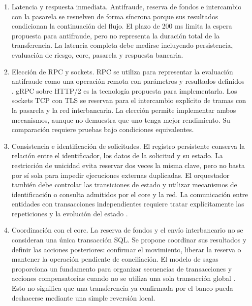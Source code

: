 \documentclass[12pt,a4paper]{article}
\begin{document}
\begin{enumerate}

    \item Latencia y respuesta inmediata.
    Antifraude, reserva de fondos e intercambio con la
    pasarela se resuelven de forma síncrona porque sus
    resultados condicionan la continuación del flujo.
    El plazo de 200 ms limita la espera propuesta para
    antifraude, pero no representa la duración total de
    la transferencia. La latencia completa debe medirse
    incluyendo persistencia, evaluación de riesgo, core,
    pasarela y respuesta bancaria.

    \item Elección de RPC y sockets.
    RPC se utiliza para representar la evaluación antifraude
    como una operación remota con parámetros y resultados
    definidos \cite{birrell1984}. gRPC sobre HTTP/2 es la
    tecnología propuesta para implementarla. Los sockets
    TCP con TLS se reservan para el intercambio explícito
    de tramas con la pasarela y la red interbancaria.
    La elección permite implementar ambos mecanismos,
    aunque no demuestra que uno tenga mejor rendimiento.
    Su comparación requiere pruebas bajo condiciones
    equivalentes.

    \item Consistencia e identificación de solicitudes.
    El registro persistente conserva la relación entre
    el identificador, los datos de la solicitud y su estado.
    La restricción de unicidad evita reservar dos veces
    la misma clave, pero no basta por sí sola para impedir
    ejecuciones externas duplicadas. El orquestador también
    debe controlar las transiciones de estado y utilizar
    mecanismos de identificación o consulta admitidos
    por el core y la red. La comunicación entre entidades
    con transacciones independientes requiere tratar
    explícitamente las repeticiones y la evolución
    del estado \cite{helland2017}.

    \item Coordinación con el core.
    La reserva de fondos y el envío interbancario no se
    consideran una única transacción SQL. Se propone
    coordinar sus resultados y definir las acciones
    posteriores: confirmar el movimiento, liberar la
    reserva o mantener la operación pendiente de
    conciliación. El modelo de sagas proporciona un
    fundamento para organizar secuencias de transacciones
    y acciones compensatorias cuando no se utiliza una
    sola transacción global \cite{garciamolina1987}.
    Esto no significa que una transferencia ya confirmada
    por el banco pueda deshacerse mediante una simple
    reversión local.


\end{enumerate}
\end{document}
